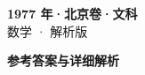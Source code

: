 \documentclass[zihao=-4, a4paper]{ctexart}
\begin{document}
\begin{center}
  {\Large\bfseries 1977 年·北京卷·文科}\\[4pt]
  {\large 数学 · 解析版}
\end{center}
\medskip
{}

\clearpage
{}
\begin{center}{\Large\bfseries 参考答案与详细解析}\end{center}
\medskip

\end{document}
